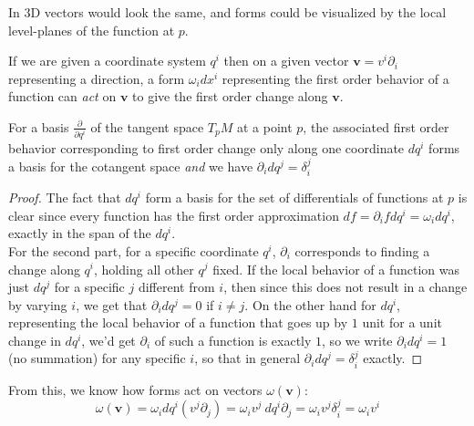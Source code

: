 \documentclass[../master.tex]{subfiles}
\begin{document}
	
	In $3$D vectors would look the same, and forms could be visualized by the local level-planes of the function at $p$.
	
	
	If we are given a coordinate system $q^i$ then on a given vector $\mathbf v = v^i \partial_i$ representing a direction, a form $\omega_i dx^i$ representing the first order behavior of a function can \emph{act} on $\mathbf v$ to give the first order change along $\mathbf v$. 
	
	\begin{lemma}
		For a basis $\frac{\partial}{\partial q^i}$ of the tangent space $T_p M$ at a point $p$, the associated first order behavior corresponding to first order change only along one coordinate $dq^i$ forms a basis for the cotangent space \emph{and} we have $\partial_i dq^j = \delta^j_i$
	\end{lemma}
	\begin{proof}
		The fact that $dq^i$ form a basis for the set of differentials of functions at $p$ is clear since every function has the first order approximation $df = \partial_i f dq^i = \omega_i dq^i$, exactly in the span of the $dq^i$. \\
		For the second part, for a specific coordinate $q^i$, $\partial_i$ corresponds to finding a change along $q^i$, holding all other $q^j$ fixed. If the local behavior of a function was just $dq^j$ for a specific $j$ different from $i$, then since this does not result in a change by varying $i$, we get that $\partial_i dq^j = 0$ if $i\neq j$. On the other hand for $dq^i$, representing the local behavior of a function that goes up by $1$ unit for a unit change in $dq^i$, we'd get $\partial_i$ of such a function is exactly $1$, so we write $\partial_i dq^i = 1$ (no summation) for any specific $i$, so that in general $\partial_i dq^j = \delta_i^j$ exactly.
	\end{proof}
	
	From this, we know how forms act on vectors $\omega(\mathbf v)$:
	\begin{equation}
		\omega(\mathbf v) = \omega_i dq^i (v^j \partial_j) = \omega_i v^j ~ dq^i \partial_j = \omega_i v^j \delta^j_i = \omega_i v^i
	\end{equation}
	
\end{document}
